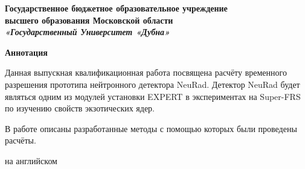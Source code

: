 \thispagestyle{empty}

\begin{center}
	{\large\bf Государственное бюджетное образовательное учреждение} \\[1.0ex]
	{\large\bf высшего  образования Московской области}\\[1.0ex]
	{\large\bf\itshape «Государственный Университет «Дубна» }
\end{center}
\centerline{\hrulefill\hrulefill}
\begin{center}
	\large\bf Аннотация
\end{center}

Данная выпускная квалификационная работа посвящена расчёту временного разрешения прототипа нейтронного детектора NeuRad. Детектор NeuRad будет являться одним из модулей установки EXPERT в экспериментах на Super-FRS по изучению свойств экзотических ядер.

В работе описаны разработанные методы с помощью которых были проведены расчёты.  

\vspace{2.9cm}
\newpage
на английском